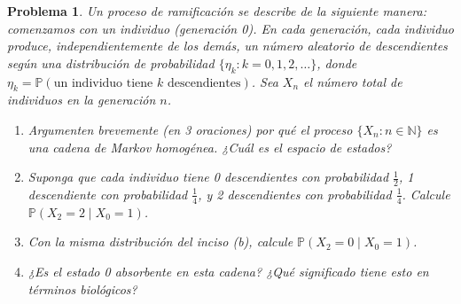 \documentclass[12pt]{article}
\newtheorem{problem}{Problema}
\begin{document}
\begin{problem}
Un proceso de ramificación se describe de la siguiente manera: comenzamos con un individuo (generación 0). En cada generación, cada individuo produce, independientemente de los demás, un número aleatorio de descendientes según una distribución de probabilidad $\{\eta_k : k = 0, 1, 2, \ldots\}$, donde $\eta_k = \mathbb{P}(\text{un individuo tiene } k \text{ descendientes})$. Sea $X_n$ el número total de individuos en la generación $n$.

\begin{enumerate}
    \item[(a)] Argumenten brevemente (en 3 oraciones) por qué el proceso $\{X_n : n \in \mathbb{N}\}$ es una cadena de Markov homogénea. ¿Cuál es el espacio de estados?
    
    \item[(b)] Suponga que cada individuo tiene 0 descendientes con probabilidad $\frac{1}{2}$, 1 descendiente con probabilidad $\frac{1}{4}$, y 2 descendientes con probabilidad $\frac{1}{4}$. Calcule $\mathbb{P}(X_2 = 2 \mid X_0 = 1)$.
    
    \item[(c)] Con la misma distribución del inciso (b), calcule $\mathbb{P}(X_2 = 0 \mid X_0 = 1)$. 
    
    \item[(d)] ¿Es el estado 0 absorbente en esta cadena? ¿Qué significado tiene esto en términos biológicos?
\end{enumerate}
\end{problem}
\end{document}
